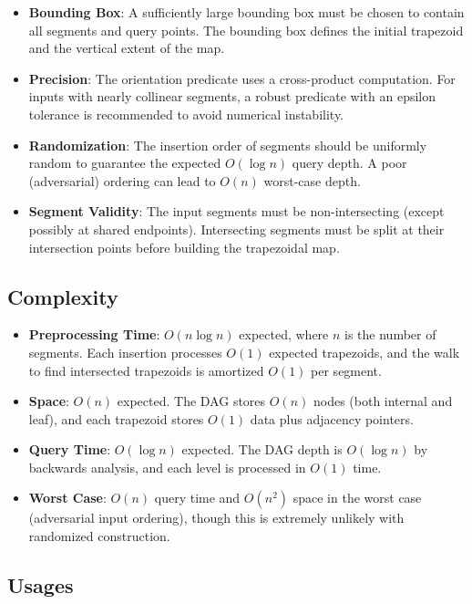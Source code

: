 \begin{itemize}
\item \textbf{Bounding Box}: A sufficiently large bounding box must be chosen to contain all segments and query points. The bounding box defines the initial trapezoid and the vertical extent of the map.
\item \textbf{Precision}: The orientation predicate  uses a cross-product computation. For inputs with nearly collinear segments, a robust predicate with an epsilon tolerance is recommended to avoid numerical instability.
\item \textbf{Randomization}: The insertion order of segments should be uniformly random to guarantee the expected $O(\log n)$ query depth. A poor (adversarial) ordering can lead to $O(n)$ worst-case depth.
\item \textbf{Segment Validity}: The input segments must be non-intersecting (except possibly at shared endpoints). Intersecting segments must be split at their intersection points before building the trapezoidal map.
\end{itemize}

\subsection{Complexity}

\begin{itemize}
\item \textbf{Preprocessing Time}: $O(n \log n)$ expected, where $n$ is the number of segments. Each insertion processes $O(1)$ expected trapezoids, and the walk to find intersected trapezoids is amortized $O(1)$ per segment.
\item \textbf{Space}: $O(n)$ expected. The DAG stores $O(n)$ nodes (both internal and leaf), and each trapezoid stores $O(1)$ data plus adjacency pointers.
\item \textbf{Query Time}: $O(\log n)$ expected. The DAG depth is $O(\log n)$ by backwards analysis, and each level is processed in $O(1)$ time.
\item \textbf{Worst Case}: $O(n)$ query time and $O(n^2)$ space in the worst case (adversarial input ordering), though this is extremely unlikely with randomized construction.
\end{itemize}

\subsection{Usages}

